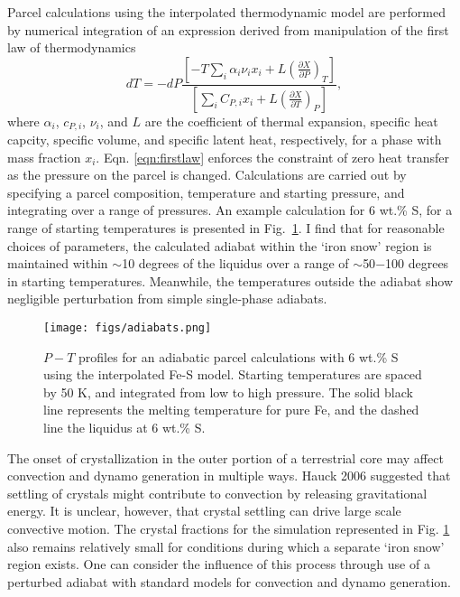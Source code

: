 Parcel calculations using the interpolated thermodynamic model are performed
by numerical integration of an expression derived from manipulation of the
first law of thermodynamics
\begin{equation}
  \label{eqn:firstlaw}
  d T = -d P \frac{\left[-T \sum_i \alpha_i\nu_ix_i +
    L\left(\frac{\partial{X}}{\partial{P}}\right)_T \right] } 
  {\left[ \sum_i C_{P,i}x_i + L \left(
    \frac{\partial{X}}{\partial{T}}\right)_P \right] },
\end{equation}
where $\alpha_i$, $c_{P,i}$, $\nu_i$, and $L$ are the coefficient of thermal
expansion, specific heat capcity, specific volume, and specific latent heat,
respectively, for a phase with mass fraction $x_i$. Eqn. \ref{eqn:firstlaw}
enforces the constraint of zero heat transfer as the pressure on the parcel is
changed. Calculations are carried out by specifying a parcel composition,
temperature and starting pressure, and integrating over a range of pressures.
An example calculation for 6 wt.\% S, for a range of starting temperatures is
presented in Fig.~\ref{fig:adiabats}. I find that for reasonable choices of
parameters, the calculated adiabat within the `iron snow' region is maintained
within $\sim$10 degrees of the liquidus over a range of $\sim$50$-$100 degrees
in starting temperatures. Meanwhile, the temperatures outside the adiabat show
negligible perturbation from simple single-phase adiabats.

 \begin{figure}[H] %
   \centering
   \texttt{[image: figs/adiabats.png]} 
   \caption{$P-T$ profiles for an adiabatic parcel calculations with 6 wt.\% S using the interpolated Fe-S model. Starting 
   temperatures are spaced by 50 K, and integrated from low to high pressure. The solid black line represents 
   the melting temperature for pure Fe, and the dashed line the liquidus at 6 wt.\% S.}
   \label{fig:adiabats}
\end{figure}

The onset of crystallization in the outer portion of a terrestrial core may
affect convection and dynamo generation in multiple ways. Hauck 2006
\cite{Hauck2006} suggested that settling of crystals might contribute to
convection by releasing gravitational energy. It is unclear, however, that
crystal settling can drive large scale convective motion. The crystal fractions
for the simulation represented in Fig. \ref{fig:adiabats} also remains
relatively small for conditions during which a separate `iron snow' region
exists. One can consider the influence of this process through use of a
perturbed adiabat with standard models for convection and dynamo generation.

